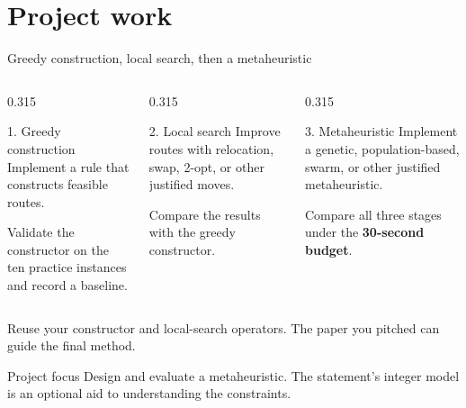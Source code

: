\documentclass[table]{customIMTbeamer/imt_pres}
\begin{document}
\section*{Project work}
\begin{frame}{Greedy construction, local search, then a metaheuristic}
\begin{columns}[T,onlytextwidth]
\begin{column}{0.315\textwidth}
\begin{block}{1. Greedy construction}
Implement a rule that constructs feasible routes.

Validate the constructor on the ten practice instances and record a baseline.
\end{block}
\end{column}
\begin{column}{0.315\textwidth}
\begin{block}{2. Local search}
Improve routes with relocation, swap, 2-opt, or other justified moves.

Compare the results with the greedy constructor.
\end{block}
\end{column}
\begin{column}{0.315\textwidth}
\begin{block}{3. Metaheuristic}
Implement a genetic, population-based, swarm, or other justified metaheuristic.

Compare all three stages under the \textbf{30-second budget}.
\end{block}
\end{column}
\end{columns}
Reuse your constructor and local-search operators. The paper you pitched can guide the final method.
\begin{alertblock}{Project focus}
Design and evaluate a metaheuristic. The statement's integer model is an optional aid to understanding the constraints.
\end{alertblock}
\end{frame}
\end{document}
